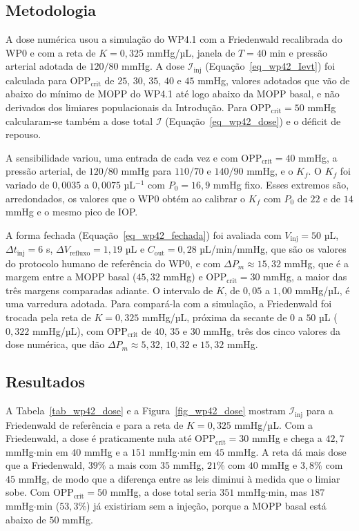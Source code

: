 \subsection{Metodologia}

A dose numérica usou a simulação do WP4.1 com a Friedenwald recalibrada do WP0 e com a reta de $K=0{,}325$ mmHg/µL, janela de $T=40$ min e pressão arterial adotada de $120/80$ mmHg. A dose $\mathcal{I}_{\mathrm{inj}}$ (Equação~\ref{eq_wp42_Ievt}) foi calculada para $\mathrm{OPP}_{\text{crit}}$ de $25$, $30$, $35$, $40$ e $45$ mmHg, valores adotados que vão de abaixo do mínimo de MOPP do WP4.1 até logo abaixo da MOPP basal, e não derivados dos limiares populacionais da Introdução. Para $\mathrm{OPP}_{\text{crit}}=50$ mmHg calcularam-se também a dose total $\mathcal{I}$ (Equação~\ref{eq_wp42_dose}) e o déficit de repouso.

A sensibilidade variou, uma entrada de cada vez e com $\mathrm{OPP}_{\text{crit}}=40$ mmHg, a pressão arterial, de $120/80$ mmHg para $110/70$ e $140/90$ mmHg, e o $K_f$. O $K_f$ foi variado de $0{,}0035$ a $0{,}0075$ µL$^{-1}$ com $P_0=16{,}9$ mmHg fixo. Esses extremos são, arredondados, os valores que o WP0 obtém ao calibrar o $K_f$ com $P_0$ de $22$ e de $14$ mmHg e o mesmo pico de IOP.

A forma fechada (Equação~\ref{eq_wp42_fechada}) foi avaliada com $V_{\text{inj}}=50$ µL, $\Delta t_{\text{inj}}=6$ s, $\Delta V_{\text{refluxo}}=1{,}19$ µL e $C_{\text{out}}=0{,}28$ µL/min/mmHg, que são os valores do protocolo humano de referência do WP0, e com $\Delta P_{m}\approx15{,}32$ mmHg, que é a margem entre a MOPP basal ($45{,}32$ mmHg) e $\mathrm{OPP}_{\text{crit}}=30$ mmHg, a maior das três margens comparadas adiante. O intervalo de $K$, de $0{,}05$ a $1{,}00$ mmHg/µL, é uma varredura adotada. Para compará-la com a simulação, a Friedenwald foi trocada pela reta de $K=0{,}325$ mmHg/µL, próxima da secante de $0$ a $50$ µL ($0{,}322$ mmHg/µL), com $\mathrm{OPP}_{\text{crit}}$ de $40$, $35$ e $30$ mmHg, três dos cinco valores da dose numérica, que dão $\Delta P_{m}\approx5{,}32$, $10{,}32$ e $15{,}32$ mmHg.

\subsection{Resultados}

A Tabela~\ref{tab_wp42_dose} e a Figura~\ref{fig_wp42_dose} mostram $\mathcal{I}_{\mathrm{inj}}$ para a Friedenwald de referência e para a reta de $K=0{,}325$ mmHg/µL. Com a Friedenwald, a dose é praticamente nula até $\mathrm{OPP}_{\text{crit}}=30$ mmHg e chega a $42{,}7$ mmHg$\cdot$min em $40$ mmHg e a $151$ mmHg$\cdot$min em $45$ mmHg. A reta dá mais dose que a Friedenwald, $39\%$ a mais com $35$ mmHg, $21\%$ com $40$ mmHg e $3{,}8\%$ com $45$ mmHg, de modo que a diferença entre as leis diminui à medida que o limiar sobe. Com $\mathrm{OPP}_{\text{crit}}=50$ mmHg, a dose total seria $351$ mmHg$\cdot$min, mas $187$ mmHg$\cdot$min ($53{,}3\%$) já existiriam sem a injeção, porque a MOPP basal está abaixo de $50$ mmHg.

